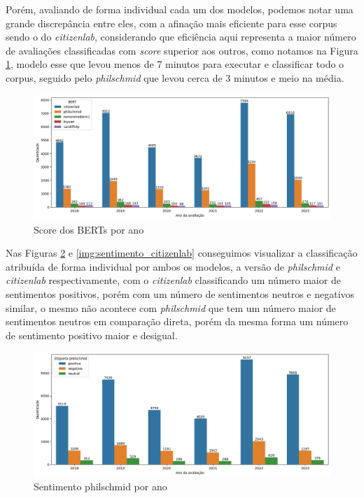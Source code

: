Porém, avaliando de forma individual cada um dos modelos, podemos notar uma grande discrepância entre eles, com a afinação mais eficiente para esse corpus sendo o do \textit{citizenlab}, considerando que eficiência aqui representa a maior número de avaliações classificadas com \textit{score} superior aos outros, como notamos na Figura \ref{img:rinha_de_berts}, modelo esse que levou menos de 7 minutos para executar e classificar todo o corpus, seguido pelo \textit{philschmid} que levou cerca de 3 minutos e meio na média.

\begin{figure}
	\centering
	\includegraphics[width=1\textwidth]{figs/bert/desempenho_berts.png}
	\caption{Score dos BERTs por ano}
	\label{img:rinha_de_berts}
\end{figure}

Nas Figuras \ref{img:sentimento_phil} e \ref{img:sentimento_citizenlab} conseguimos visualizar a classificação atribuída de forma individual por ambos os modelos, a versão de \textit{philschmid} e \textit{citizenlab} respectivamente, com o \textit{citizenlab} classificando um número maior de sentimentos positivos, porém com um número de sentimentos neutros e negativos similar, o mesmo não acontece com \textit{philschmid} que tem um número maior de sentimentos neutros em comparação direta, porém da mesma forma um número de sentimento positivo maior e desigual.

\begin{figure}
	\centering
	\centering
	\includegraphics[width=1\textwidth]{figs/bert/classificacao_phil.png}
	\caption{Sentimento philschmid por ano}
	\label{img:sentimento_phil}
\end{figure}

